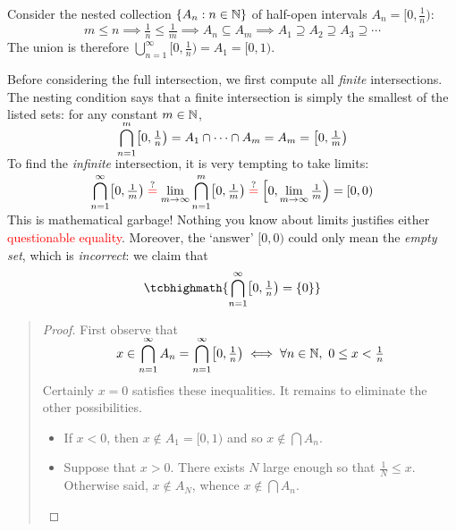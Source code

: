 \begin{example}{}{}
	\def\vs{\vspace*{2pt}}
	Consider the nested collection $\{A_n:n\in\mathbb{N}\}$ of half-open intervals $A_n=\bigl[0,\frac 1n\bigr)$:
	\[
		m\le n\implies \tfrac 1n\le \tfrac 1m\implies A_n\subseteq A_m \implies A_1\supseteq A_2\supseteq A_3\supseteq \cdots
	\]
	The union is therefore $\bigcup_{n=1}^\infty [0,\frac 1n) =A_1=[0,1)$.\smallbreak
	
	Before considering the full intersection, we first compute all \emph{finite} intersections. The nesting condition says that a finite intersection is simply the smallest of the listed sets: for any constant $m\in\mathbb{N}$,
	\[
		\smash{\bigcap_{n=1}^m} \bigl[0,\tfrac 1n\bigr) =A_1\cap\cdots\cap A_m =A_m=\bigl[0,\tfrac 1m\bigr)
	\]
	To find the \emph{infinite} intersection, it is very tempting to take limits:
	\[
		\smash{\bigcap\limits_{n=1}^\infty \bigl[0,\tfrac 1m\bigr) \mathrel{\overset{?}{\textcolor{red}{=}}} \lim_{m\to\infty}\bigcap_{n=1}^m} \bigl[0,\tfrac 1m\bigr)  \mathrel{\overset{?}{\textcolor{red}{=}}} \Bigl[0,\lim_{m\to\infty}\tfrac 1m\Bigr)=[0,0)
	\]
	This is mathematical garbage! Nothing you know about limits justifies either \textcolor{red}{questionable equality}. Moreover, the `answer' $[0,0)$ could only mean the \emph{empty set}, which is \emph{incorrect}: we claim that
	\[
		\tcbhighmath{\bigcap\limits_{n=1}^\infty \bigl[0,\tfrac 1n\bigr)=\{0\}}
	\]

	\begin{quote}
		\begin{proof}
			First observe that
			\[
				x\in \smash[t]{\bigcap\limits_{n=1}^\infty A_n=\bigcap\limits_{n=1}^\infty \bigl[0,\tfrac 1n\bigr)} \iff \forall n\in\mathbb{N},\ 0\le x<\tfrac 1n
			\]
			Certainly $x=0$ satisfies these inequalities. It remains to eliminate the other possibilities.
			\begin{itemize}\itemsep2pt
			  \item If $x<0$, then $x\notin A_1=[0,1)$ and so $x\notin\bigcap A_n$.
			  \item	Suppose that $x>0$. There exists\footnotemark{} $N$ large enough so that $\frac 1N\le x$. Otherwise said, $x\notin A_N$, whence $x\notin\bigcap A_n$. \qedhere
			\end{itemize}
		\end{proof}
	\end{quote}
	

\end{example}
